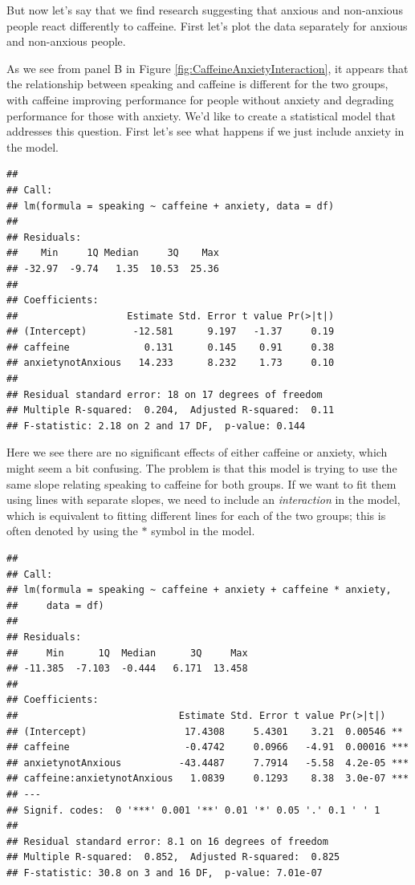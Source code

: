 \documentclass[
  12pt,
]{book}
\begin{document}
But now let's say that we find research suggesting that anxious and non-anxious people react differently to caffeine. First let's plot the data separately for anxious and non-anxious people.

As we see from panel B in Figure \ref{fig:CaffeineAnxietyInteraction}, it appears that the relationship between speaking and caffeine is different for the two groups, with caffeine improving performance for people without anxiety and degrading performance for those with anxiety. We'd like to create a statistical model that addresses this question. First let's see what happens if we just include anxiety in the model.

\begin{verbatim}
## 
## Call:
## lm(formula = speaking ~ caffeine + anxiety, data = df)
## 
## Residuals:
##    Min     1Q Median     3Q    Max 
## -32.97  -9.74   1.35  10.53  25.36 
## 
## Coefficients:
##                   Estimate Std. Error t value Pr(>|t|)
## (Intercept)        -12.581      9.197   -1.37     0.19
## caffeine             0.131      0.145    0.91     0.38
## anxietynotAnxious   14.233      8.232    1.73     0.10
## 
## Residual standard error: 18 on 17 degrees of freedom
## Multiple R-squared:  0.204,  Adjusted R-squared:  0.11 
## F-statistic: 2.18 on 2 and 17 DF,  p-value: 0.144
\end{verbatim}

Here we see there are no significant effects of either caffeine or anxiety, which might seem a bit confusing. The problem is that this model is trying to use the same slope relating speaking to caffeine for both groups. If we want to fit them using lines with separate slopes, we need to include an \emph{interaction} in the model, which is equivalent to fitting different lines for each of the two groups; this is often denoted by using the \(*\) symbol in the model.

\begin{verbatim}
## 
## Call:
## lm(formula = speaking ~ caffeine + anxiety + caffeine * anxiety, 
##     data = df)
## 
## Residuals:
##     Min      1Q  Median      3Q     Max 
## -11.385  -7.103  -0.444   6.171  13.458 
## 
## Coefficients:
##                            Estimate Std. Error t value Pr(>|t|)    
## (Intercept)                 17.4308     5.4301    3.21  0.00546 ** 
## caffeine                    -0.4742     0.0966   -4.91  0.00016 ***
## anxietynotAnxious          -43.4487     7.7914   -5.58  4.2e-05 ***
## caffeine:anxietynotAnxious   1.0839     0.1293    8.38  3.0e-07 ***
## ---
## Signif. codes:  0 '***' 0.001 '**' 0.01 '*' 0.05 '.' 0.1 ' ' 1
## 
## Residual standard error: 8.1 on 16 degrees of freedom
## Multiple R-squared:  0.852,  Adjusted R-squared:  0.825 
## F-statistic: 30.8 on 3 and 16 DF,  p-value: 7.01e-07
\end{verbatim}
\end{document}
